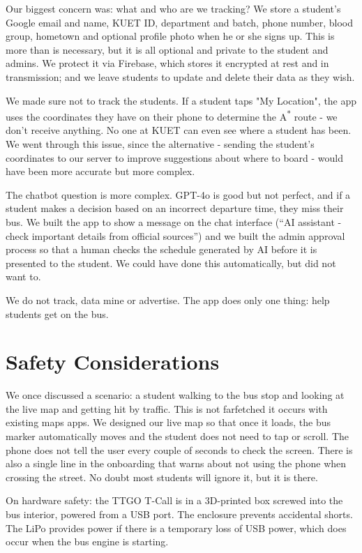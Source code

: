 \documentclass[12pt,a4paper]{report}
\begin{document}
Our biggest concern was: what and who are we tracking? We store a student's Google email and name, KUET ID, department and batch, phone number, blood group, hometown and optional profile photo when he or she signs up. This is more than is necessary, but it is all optional and private to the student and admins. We protect it via Firebase, which stores it encrypted at rest and in transmission; and we leave students to update and delete their data as they wish.

We made sure not to track the students. If a student taps "My Location", the app uses the coordinates they have on their phone to determine the A\textsuperscript{*} route - we don't receive anything. No one at KUET can even see where a student has been. We went through this issue, since the alternative - sending the student's coordinates to our server to improve suggestions about where to board - would have been more accurate but more complex.

The chatbot question is more complex. GPT-4o is good but not perfect, and if a student makes a decision based on an incorrect departure time, they miss their bus. We built the app to show a message on the chat interface (``AI assistant - check important details from official sources'') and we built the admin approval process so that a human checks the schedule generated by AI before it is presented to the student. We could have done this automatically, but did not want to.

We do not track, data mine or advertise. The app does only one thing: help students get on the bus.
\section{Safety Considerations}

We once discussed a scenario: a student walking to the bus stop and looking at the live map and getting hit by traffic. This is not farfetched it occurs with existing maps apps. We designed our live map so that once it loads, the bus marker automatically moves and the student does not need to tap or scroll. The phone does not tell the user every couple of seconds to check the screen. There is also a single line in the onboarding that warns about not using the phone when crossing the street. No doubt most students will ignore it, but it is there.

On hardware safety: the TTGO T-Call is in a 3D-printed box screwed into the bus interior, powered from a USB port. The enclosure prevents accidental shorts. The LiPo provides power if there is a temporary loss of USB power, which does occur when the bus engine is starting.
\end{document}

